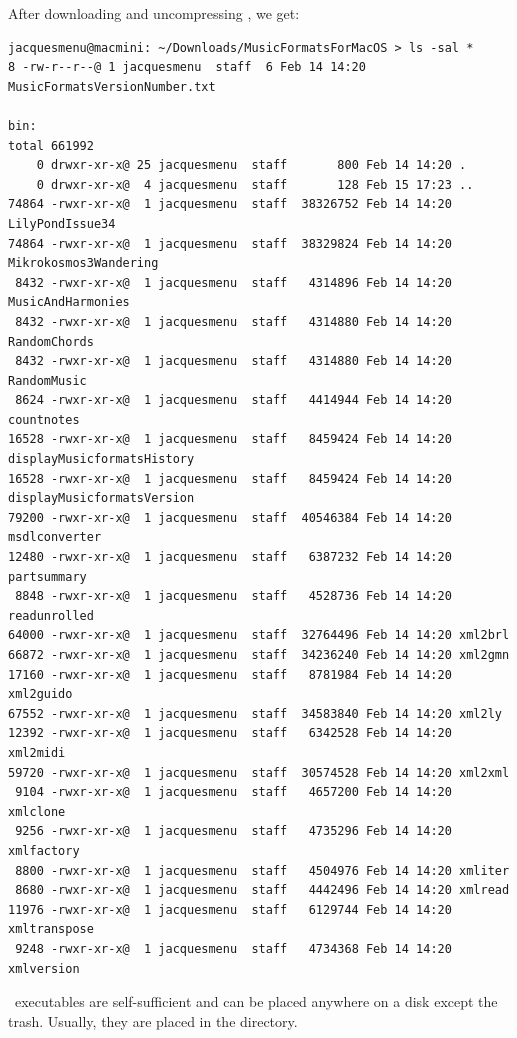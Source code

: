After downloading and uncompressing , we get:
\begin{lstlisting}[language=Terminal]
jacquesmenu@macmini: ~/Downloads/MusicFormatsForMacOS > ls -sal *
8 -rw-r--r--@ 1 jacquesmenu  staff  6 Feb 14 14:20 MusicFormatsVersionNumber.txt

bin:
total 661992
    0 drwxr-xr-x@ 25 jacquesmenu  staff       800 Feb 14 14:20 .
    0 drwxr-xr-x@  4 jacquesmenu  staff       128 Feb 15 17:23 ..
74864 -rwxr-xr-x@  1 jacquesmenu  staff  38326752 Feb 14 14:20 LilyPondIssue34
74864 -rwxr-xr-x@  1 jacquesmenu  staff  38329824 Feb 14 14:20 Mikrokosmos3Wandering
 8432 -rwxr-xr-x@  1 jacquesmenu  staff   4314896 Feb 14 14:20 MusicAndHarmonies
 8432 -rwxr-xr-x@  1 jacquesmenu  staff   4314880 Feb 14 14:20 RandomChords
 8432 -rwxr-xr-x@  1 jacquesmenu  staff   4314880 Feb 14 14:20 RandomMusic
 8624 -rwxr-xr-x@  1 jacquesmenu  staff   4414944 Feb 14 14:20 countnotes
16528 -rwxr-xr-x@  1 jacquesmenu  staff   8459424 Feb 14 14:20 displayMusicformatsHistory
16528 -rwxr-xr-x@  1 jacquesmenu  staff   8459424 Feb 14 14:20 displayMusicformatsVersion
79200 -rwxr-xr-x@  1 jacquesmenu  staff  40546384 Feb 14 14:20 msdlconverter
12480 -rwxr-xr-x@  1 jacquesmenu  staff   6387232 Feb 14 14:20 partsummary
 8848 -rwxr-xr-x@  1 jacquesmenu  staff   4528736 Feb 14 14:20 readunrolled
64000 -rwxr-xr-x@  1 jacquesmenu  staff  32764496 Feb 14 14:20 xml2brl
66872 -rwxr-xr-x@  1 jacquesmenu  staff  34236240 Feb 14 14:20 xml2gmn
17160 -rwxr-xr-x@  1 jacquesmenu  staff   8781984 Feb 14 14:20 xml2guido
67552 -rwxr-xr-x@  1 jacquesmenu  staff  34583840 Feb 14 14:20 xml2ly
12392 -rwxr-xr-x@  1 jacquesmenu  staff   6342528 Feb 14 14:20 xml2midi
59720 -rwxr-xr-x@  1 jacquesmenu  staff  30574528 Feb 14 14:20 xml2xml
 9104 -rwxr-xr-x@  1 jacquesmenu  staff   4657200 Feb 14 14:20 xmlclone
 9256 -rwxr-xr-x@  1 jacquesmenu  staff   4735296 Feb 14 14:20 xmlfactory
 8800 -rwxr-xr-x@  1 jacquesmenu  staff   4504976 Feb 14 14:20 xmliter
 8680 -rwxr-xr-x@  1 jacquesmenu  staff   4442496 Feb 14 14:20 xmlread
11976 -rwxr-xr-x@  1 jacquesmenu  staff   6129744 Feb 14 14:20 xmltranspose
 9248 -rwxr-xr-x@  1 jacquesmenu  staff   4734368 Feb 14 14:20 xmlversion
\end{lstlisting}

\MacOS\ executables are self-sufficient and can be placed anywhere on a disk except the trash. Usually, they are placed in the  directory.


